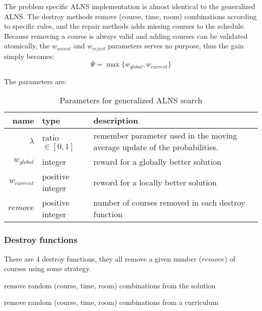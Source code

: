The problem specific ALNS implementation is almost identical to the generalized ALNS. The destroy methods remove (course, time, room) combinations according to specific rules, and the repair methods adds missing courses to the schedule. Because removing a course is always valid and adding courses can be validated atomically, the $w_{accent}$ and $w_{reject}$ parameters serves no purpose, thus the gain simply becomes:
\begin{equation}
\Psi = \max\{w_{global}, w_{current}\}
\end{equation}

The parameters are:

\begin{table}[H]
\centering
\begin{tabular}{r|p{2.5cm}|p{6cm}}
	name & type & description \\ \hline
	$\lambda$ & ratio $\in [0, 1]$ & remember parameter used in the moving average update of the probabilities. \\
	$w_{global}$ & integer & reward for a globally better solution \\
	$w_{current}$ & positive integer & reword for a locally better solution \\
	$remove$ & positive integer & number of courses removed in each destroy function
\end{tabular}
\caption{Parameters for generalized ALNS search}
\end{table}

\subsubsection{Destroy functions}

There are 4 destroy functions, they all remove a given number ($remove$) of courses using some strategy.

\begin{algorithm}[H]
  \caption{remove random (course, time, room) combinations from the solution}
  \begin{algorithmic}[1]
        \State {}
      \EndFor
    \EndFunction
  \end{algorithmic}
\end{algorithm}

\begin{algorithm}[H]
  \caption{remove random (course, time, room) combinations from a curriculum}
  \begin{algorithmic}[1]
        \State {}
      \EndFor
    \EndFunction
  \end{algorithmic}
\end{algorithm}

